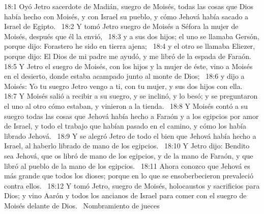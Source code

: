 18:1 Oyó Jetro sacerdote de Madián, suegro de Moisés, todas las cosas que Dios había hecho con Moisés, y con Israel su pueblo, y cómo Jehová había sacado a Israel de Egipto.  
18:2 Y tomó Jetro suegro de Moisés a Séfora la mujer de Moisés, después que él la envió,  
18:3 y a sus dos hijos; el uno se llamaba Gersón, porque dijo: Forastero he sido en tierra ajena;  
18:4 y el otro se llamaba Eliezer, porque dijo: El Dios de mi padre me ayudó, y me libró de la espada de Faraón.  
18:5 Y Jetro el suegro de Moisés, con los hijos y la mujer de éste, vino a Moisés en el desierto, donde estaba acampado junto al monte de Dios;  
18:6 y dijo a Moisés: Yo tu suegro Jetro vengo a ti, con tu mujer, y sus dos hijos con ella.  
18:7 Y Moisés salió a recibir a su suegro, y se inclinó, y lo besó; y se preguntaron el uno al otro cómo estaban, y vinieron a la tienda.  
18:8 Y Moisés contó a su suegro todas las cosas que Jehová había hecho a Faraón y a los egipcios por amor de Israel, y todo el trabajo que habían pasado en el camino, y cómo los había librado Jehová.  
18:9 Y se alegró Jetro de todo el bien que Jehová había hecho a Israel, al haberlo librado de mano de los egipcios.  
18:10 Y Jetro dijo: Bendito sea Jehová, que os libró de mano de los egipcios, y de la mano de Faraón, y que libró al pueblo de la mano de los egipcios.  
18:11 Ahora conozco que Jehová es más grande que todos los dioses; porque en lo que se ensoberbecieron prevaleció contra ellos.  
18:12 Y tomó Jetro, suegro de Moisés, holocaustos y sacrificios para Dios; y vino Aarón y todos los ancianos de Israel para comer con el suegro de Moisés delante de Dios.  
Nombramiento de jueces  

